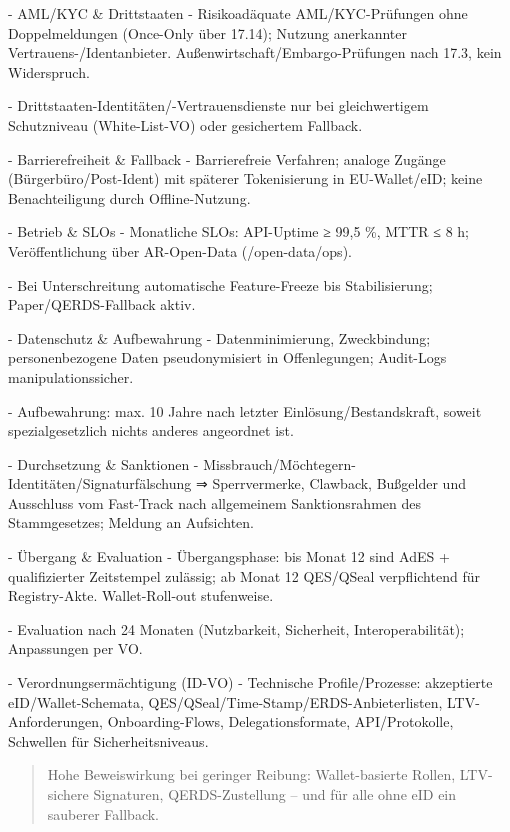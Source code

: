 \documentclass[12pt,a4paper]{scrartcl}
\begin{document}
- AML/KYC \& Drittstaaten
- Risikoadäquate AML/KYC-Prüfungen ohne Doppelmeldungen (Once-Only über 17.14); Nutzung anerkannter Vertrauens-/Identanbieter. Außenwirtschaft/Embargo-Prüfungen nach 17.3, kein Widerspruch.

- Drittstaaten-Identitäten/-Vertrauensdienste nur bei gleichwertigem Schutzniveau (White-List-VO) oder gesichertem Fallback.

- Barrierefreiheit \& Fallback
- Barrierefreie Verfahren; analoge Zugänge (Bürgerbüro/Post-Ident) mit späterer Tokenisierung in EU-Wallet/eID; keine Benachteiligung durch Offline-Nutzung.

- Betrieb \& SLOs
- Monatliche SLOs: API-Uptime ≥ 99,5 \%, MTTR ≤ 8 h; Veröffentlichung über AR-Open-Data (/open-data/ops).

- Bei Unterschreitung automatische Feature-Freeze bis Stabilisierung; Paper/QERDS-Fallback aktiv.

- Datenschutz \& Aufbewahrung
- Datenminimierung, Zweckbindung; personenbezogene Daten pseudonymisiert in Offenlegungen; Audit-Logs manipulationssicher.

- Aufbewahrung: max. 10 Jahre nach letzter Einlösung/Bestandskraft, soweit spezialgesetzlich nichts anderes angeordnet ist.

- Durchsetzung \& Sanktionen
- Missbrauch/Möchtegern-Identitäten/Signaturfälschung ⇒ Sperrvermerke, Clawback, Bußgelder und Ausschluss vom Fast-Track nach allgemeinem Sanktionsrahmen des Stammgesetzes; Meldung an Aufsichten.

- Übergang \& Evaluation
- Übergangsphase: bis Monat 12 sind AdES + qualifizierter Zeitstempel zulässig; ab Monat 12 QES/QSeal verpflichtend für Registry-Akte. Wallet-Roll-out stufenweise.

- Evaluation nach 24 Monaten (Nutzbarkeit, Sicherheit, Interoperabilität); Anpassungen per VO.

- Verordnungsermächtigung (ID-VO)
- Technische Profile/Prozesse: akzeptierte eID/Wallet-Schemata, QES/QSeal/Time-Stamp/ERDS-Anbieterlisten, LTV-Anforderungen, Onboarding-Flows, Delegationsformate, API/Protokolle, Schwellen für Sicherheitsniveaus.

{\footnotesize\begin{quote}
Hohe Beweiswirkung bei geringer Reibung: Wallet-basierte Rollen, LTV-sichere Signaturen, QERDS-Zustellung -- und für alle ohne eID ein sauberer Fallback.
\end{quote}}



\end{document}
